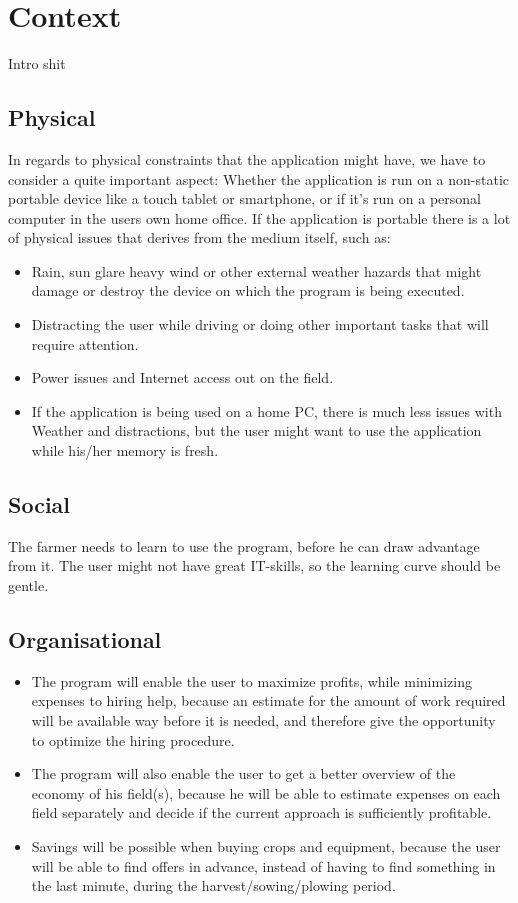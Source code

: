 \section{Context}
Intro shit
\subsection{Physical}
In regards to physical constraints that the application might have, we have to consider a quite important aspect: Whether the application is run on a non-static portable device like a touch tablet or smartphone, or if it's run on a personal computer in the users own home office. If the application is portable there is a lot of physical issues that derives from the medium itself, such as:
\begin{itemize}[noitemsep]
    \item Rain, sun glare heavy wind or other external weather hazards that might damage or destroy the device on which the program is being executed.
    \item Distracting the user while driving or doing other important tasks that will require attention.
    \item Power issues and Internet access out on the field.
    \item If the application is being used on a home PC, there is much less issues with Weather and distractions, but the user might want to use the application while his/her memory is fresh.
\end{itemize}

\subsection{Social}
The farmer needs to learn to use the program, before he can draw advantage from it. The user might not have great IT-skills, so the learning curve should be gentle.

\subsection{Organisational}
\begin{itemize}[noitemsep]
    \item The program will enable the user to maximize profits, while minimizing expenses to hiring help, because an estimate for the amount of work required will be available way before it is needed, and therefore give the opportunity to optimize the hiring procedure.
    \item The program will also enable the user to get a better overview of the economy of his field(s), because he will be able to estimate expenses on each field separately and decide if the current approach is sufficiently profitable.
    \item Savings will be possible when buying crops and equipment, because the user will be able to find offers in advance, instead of having to find something in the last minute, during the harvest/sowing/plowing period.
\end{itemize}
